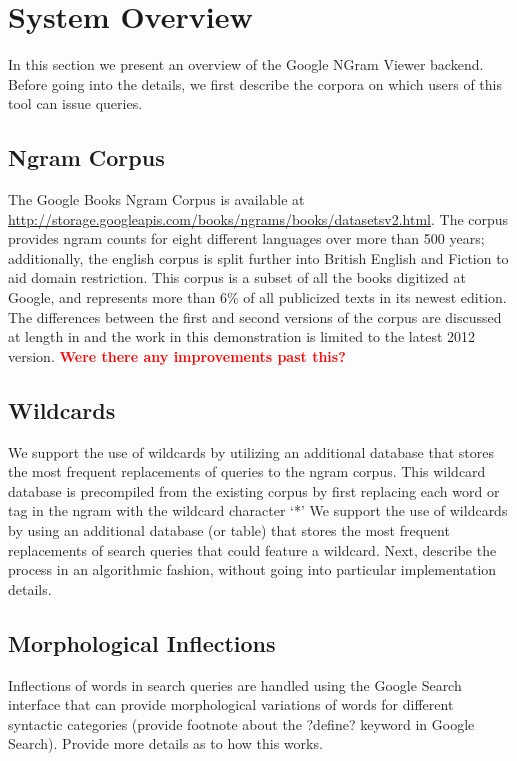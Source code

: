\documentclass[11pt]{article}
\begin{document}
\section{System Overview}

In this section we present an overview of the Google NGram Viewer backend. Before going into the details, we first describe the corpora on which users of this tool can issue queries.

\subsection{Ngram Corpus}
The Google Books Ngram Corpus is available at \url{http://storage.googleapis.com/books/ngrams/books/datasetsv2.html}. The corpus provides ngram counts for eight different languages over more than 500 years; additionally, the english corpus is split further into British English and Fiction to aid domain restriction. This corpus is a subset of all the books digitized at Google, and represents more than 6\% of all publicized texts in its newest edition. The differences between the first and second versions of the corpus are discussed at length in  and the work in this demonstration is limited to the latest 2012 version.
\textcolor{red}{\bf Were there any improvements past this?}

\begin{table*}

\end{table*}

\subsection{Wildcards}
We support the use of wildcards by utilizing an additional database that stores the most frequent replacements of queries to the ngram corpus. This wildcard database is precompiled from the existing corpus by first replacing each word or tag in the ngram with the wildcard character `*'
We support the use of wildcards by using an additional database (or table) that stores the most frequent replacements of search queries that could feature a wildcard. Next, describe the process in an algorithmic fashion, without going into particular implementation details.

\subsection{Morphological Inflections}
Inflections of words in search queries are handled using the Google Search interface that can provide morphological variations of words for different syntactic categories (provide footnote about the ?define? keyword in Google Search). Provide more details as to how this works.
\end{document}
